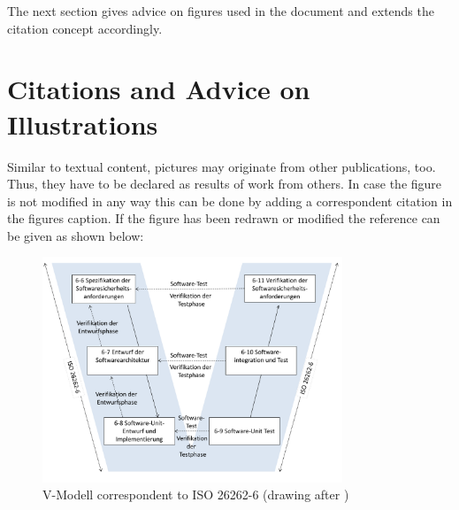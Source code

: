 The next section gives advice on figures used in the document and extends the citation concept accordingly.


\section{Citations and Advice on Illustrations}

Similar to textual content, pictures may originate from other publications, too.
Thus, they have to be declared as results of work from others.
In case the figure is not modified in any way this can be done by adding a correspondent citation in the figures caption.
If the figure has been redrawn or modified the reference can be given as shown below:
\begin{figure}[H]
	\centering
		\includegraphics[width=0.80\textwidth]{figures/V-Modell.pdf}
	\caption{V-Modell correspondent to ISO 26262-6 (drawing after \cite{verificationvalidation})}
	\label{fig:vmodell}
\end{figure}

